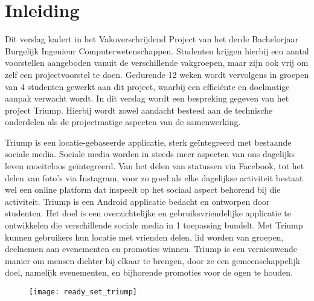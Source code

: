 \chapter{Inleiding}
Dit verslag kadert in het Vakoverschrijdend Project van het derde Bachelorjaar Burgelijk Ingenieur Computerwetenschappen. Studenten krijgen hierbij een aantal voorstellen aangeboden vanuit de verschillende vakgroepen, maar zijn ook vrij om zelf een projectvoorstel te doen. Gedurende 12 weken wordt vervolgens in groepen van 4 studenten gewerkt aan dit project, waarbij een efficiënte en doelmatige aanpak verwacht wordt. In dit verslag wordt een bespreking gegeven van het project Triump. Hierbij wordt zowel aandacht besteed aan de technische onderdelen als de projectmatige aspecten van de samenwerking.


Triump is een locatie-gebaseerde applicatie, sterk geïntegreerd met bestaande sociale media.
Sociale media worden in steeds meer aspecten van ons dagelijks leven moeiteloos geïntegreerd. Van het delen van statussen via Facebook, tot het delen van foto’s via Instagram, voor zo goed als elke dagelijkse activiteit bestaat wel een online platform dat inspeelt op het sociaal aspect behorend bij die activiteit.
Triump is een Android applicatie bedacht en ontworpen door studenten. Het doel is een overzichtelijke en gebruiksvriendelijke applicatie te ontwikkelen die verschillende sociale media in 1 toepassing bundelt. Met Triump kunnen gebruikers hun locatie met vrienden delen, lid worden van groepen, deelnemen aan evenementen en promoties winnen.
Triump is een vernieuwende manier om mensen dichter bij elkaar te brengen, door ze een gemeenschappelijk doel, namelijk evenementen, en bijhorende promoties voor de ogen te houden.

\begin{figure}[H]
	\centering
	\texttt{[image: ready\_set\_triump]}
	\label{fig:inleiding}
	
\end{figure}
